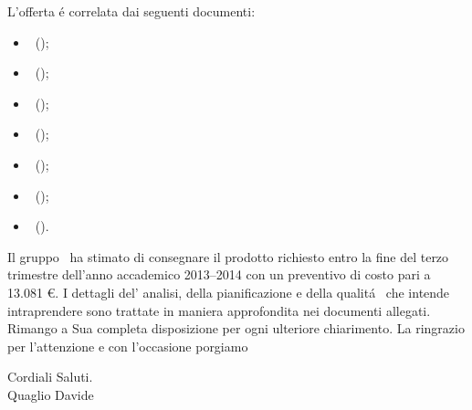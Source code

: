 \documentclass[11pt,a4paper]{article}
\begin{document}
L'offerta \'e correlata dai seguenti documenti:
\begin{itemize}
\item \infoAR ~(\AnalisiDeiRequisiti);
\item \infoPDP ~(\PianoDiProgetto);
\item \infoPDQ ~(\PianoDiQualifica);
\item \infoNDP ~(\NormeDiProgetto);
\item \infoSDF ~(\StudioDiFattibilita);
\item \infoG ~(\Glossario);
\item \infoVb ~(\VerbaleB). 
\end{itemize}
Il gruppo \gruppo ~ha stimato di consegnare il prodotto richiesto entro la fine del terzo trimestre dell’anno accademico 2013–2014 con un preventivo di costo pari a 13.081 €.
I dettagli del' analisi, della pianificazione e della qualit\'a ~che \gruppo intende intraprendere sono trattate in maniera approfondita nei documenti allegati.
Rimango a Sua completa disposizione per ogni ulteriore chiarimento.
La ringrazio per l'attenzione e con l'occasione porgiamo\\
\begin{flushright}
Cordiali Saluti.\\
Quaglio Davide
\end{flushright}
\end{document}

